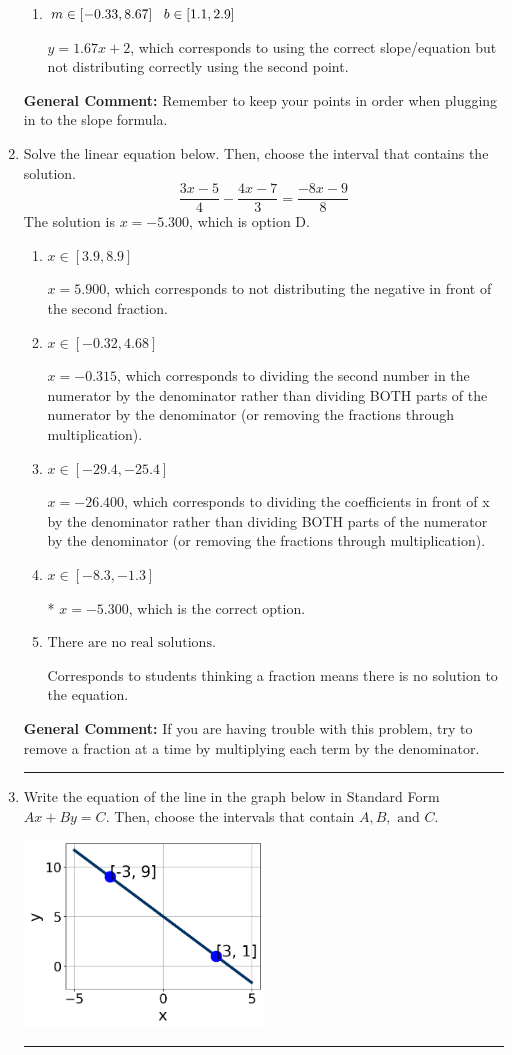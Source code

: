 \documentclass{extbook}[14pt]
\newcommand{\litem}[1]{\item #1

\rule{\textwidth}{0.4pt}}
\begin{document}
\begin{enumerate}
{\begin{enumerate}[label=\Alph*.]
* $y = 1.67x -4.0$, which is the correct option.
\item \( m \in [-0.33, 8.67] \hspace*{3mm} b \in [1.1, 2.9] \)

 $y = 1.67x + 2$, which corresponds to using the correct slope/equation but not distributing correctly using the second point.
\end{enumerate}

\textbf{General Comment:} Remember to keep your points in order when plugging in to the slope formula.
}
\litem{
Solve the linear equation below. Then, choose the interval that contains the solution.
\[ \frac{3x -5}{4} - \frac{4x -7}{3} = \frac{-8x -9}{8} \]The solution is \( x = -5.300 \), which is option D.\begin{enumerate}[label=\Alph*.]
\item \( x \in [3.9, 8.9] \)

 $x = 5.900$, which corresponds to not distributing the negative in front of the second fraction.
\item \( x \in [-0.32, 4.68] \)

 $x = -0.315$, which corresponds to dividing the second number in the numerator by the denominator rather than dividing BOTH parts of the numerator by the denominator (or removing the fractions through multiplication).
\item \( x \in [-29.4, -25.4] \)

 $x = -26.400$, which corresponds to dividing the coefficients in front of x by the denominator rather than dividing BOTH parts of the numerator by the denominator (or removing the fractions through multiplication).
\item \( x \in [-8.3, -1.3] \)

* $x = -5.300$, which is the correct option.
\item \( \text{There are no real solutions.} \)

Corresponds to students thinking a fraction means there is no solution to the equation.
\end{enumerate}

\textbf{General Comment:} If you are having trouble with this problem, try to remove a fraction at a time by multiplying each term by the denominator.
}
\litem{
Write the equation of the line in the graph below in Standard Form $Ax+By=C$. Then, choose the intervals that contain $A, B, \text{ and } C$.

\begin{center}
    \includegraphics[width=0.5\textwidth]{../Figures/linearGraphToStandardB.png}
\end{center}


}
\end{enumerate}
\end{document}
